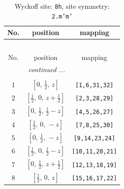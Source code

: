 \documentclass[fleqn,8pt]{jsarticle}
\begin{document}
\begin{longtable}{ccc}
\caption{Wyckoff site: {\tt 8h}, site symmetry: {\tt 2.m'm'}}
 \\
 \hline \hline
No. & position & mapping \\ \hline \endfirsthead

\multicolumn{2}{l}{\tablename\ \thetable{}} \\
 \hline \hline
No. & position & mapping \\ \hline \endhead

 \hline \hline
\multicolumn{2}{r}{\footnotesize\it continued ...} \\ \endfoot

 \hline \hline
\multicolumn{2}{r}{} \\ \endlastfoot

1 & $\left[ 0,\, \frac{1}{2},\, z \right]$ & {\tt [1,6,31,32]} \\ \hline
2 & $\left[ \frac{1}{2},\, 0,\, z + \frac{1}{2} \right]$ & {\tt [2,3,28,29]} \\ \hline
3 & $\left[ 0,\, \frac{1}{2},\, \frac{1}{2} - z \right]$ & {\tt [4,5,26,27]} \\ \hline
4 & $\left[ \frac{1}{2},\, 0,\, - z \right]$ & {\tt [7,8,25,30]} \\ \hline
5 & $\left[ 0,\, \frac{1}{2},\, - z \right]$ & {\tt [9,14,23,24]} \\ \hline
6 & $\left[ \frac{1}{2},\, 0,\, \frac{1}{2} - z \right]$ & {\tt [10,11,20,21]} \\ \hline
7 & $\left[ 0,\, \frac{1}{2},\, z + \frac{1}{2} \right]$ & {\tt [12,13,18,19]} \\ \hline
8 & $\left[ \frac{1}{2},\, 0,\, z \right]$ & {\tt [15,16,17,22]} \\
\end{longtable}
\renewcommand{\arraystretch}{1.2}
\end{document}
